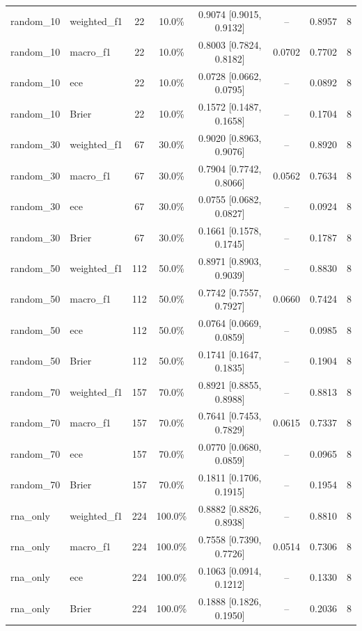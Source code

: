\begin{tabular}{llcccccc}
random\_10 & weighted\_f1 & 22 & 10.0\% & 0.9074 [0.9015, 0.9132] & -- & 0.8957 & 8 \\
random\_10 & macro\_f1 & 22 & 10.0\% & 0.8003 [0.7824, 0.8182] & 0.0702 & 0.7702 & 8 \\
random\_10 & ece & 22 & 10.0\% & 0.0728 [0.0662, 0.0795] & -- & 0.0892 & 8 \\
random\_10 & Brier & 22 & 10.0\% & 0.1572 [0.1487, 0.1658] & -- & 0.1704 & 8 \\
random\_30 & weighted\_f1 & 67 & 30.0\% & 0.9020 [0.8963, 0.9076] & -- & 0.8920 & 8 \\
random\_30 & macro\_f1 & 67 & 30.0\% & 0.7904 [0.7742, 0.8066] & 0.0562 & 0.7634 & 8 \\
random\_30 & ece & 67 & 30.0\% & 0.0755 [0.0682, 0.0827] & -- & 0.0924 & 8 \\
random\_30 & Brier & 67 & 30.0\% & 0.1661 [0.1578, 0.1745] & -- & 0.1787 & 8 \\
random\_50 & weighted\_f1 & 112 & 50.0\% & 0.8971 [0.8903, 0.9039] & -- & 0.8830 & 8 \\
random\_50 & macro\_f1 & 112 & 50.0\% & 0.7742 [0.7557, 0.7927] & 0.0660 & 0.7424 & 8 \\
random\_50 & ece & 112 & 50.0\% & 0.0764 [0.0669, 0.0859] & -- & 0.0985 & 8 \\
random\_50 & Brier & 112 & 50.0\% & 0.1741 [0.1647, 0.1835] & -- & 0.1904 & 8 \\
random\_70 & weighted\_f1 & 157 & 70.0\% & 0.8921 [0.8855, 0.8988] & -- & 0.8813 & 8 \\
random\_70 & macro\_f1 & 157 & 70.0\% & 0.7641 [0.7453, 0.7829] & 0.0615 & 0.7337 & 8 \\
random\_70 & ece & 157 & 70.0\% & 0.0770 [0.0680, 0.0859] & -- & 0.0965 & 8 \\
random\_70 & Brier & 157 & 70.0\% & 0.1811 [0.1706, 0.1915] & -- & 0.1954 & 8 \\
rna\_only & weighted\_f1 & 224 & 100.0\% & 0.8882 [0.8826, 0.8938] & -- & 0.8810 & 8 \\
rna\_only & macro\_f1 & 224 & 100.0\% & 0.7558 [0.7390, 0.7726] & 0.0514 & 0.7306 & 8 \\
rna\_only & ece & 224 & 100.0\% & 0.1063 [0.0914, 0.1212] & -- & 0.1330 & 8 \\
rna\_only & Brier & 224 & 100.0\% & 0.1888 [0.1826, 0.1950] & -- & 0.2036 & 8 \\
\bottomrule
\end{tabular}
